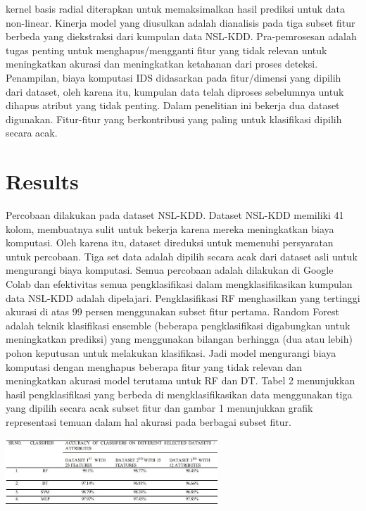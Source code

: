 \documentclass[conference]{IEEEtran}
\begin{document}
kernel basis radial diterapkan untuk memaksimalkan hasil prediksi untuk data non-linear. Kinerja model yang diusulkan adalah dianalisis pada tiga subset fitur berbeda yang diekstraksi dari kumpulan data NSL-KDD. Pra-pemrosesan adalah tugas penting untuk menghapus/mengganti fitur yang tidak relevan untuk meningkatkan akurasi dan meningkatkan ketahanan dari proses deteksi. Penampilan, biaya komputasi IDS didasarkan pada fitur/dimensi yang dipilih dari dataset, oleh karena itu, kumpulan data telah diproses sebelumnya untuk dihapus atribut yang tidak penting. Dalam penelitian ini bekerja dua dataset digunakan. Fitur-fitur yang berkontribusi yang paling untuk klasifikasi dipilih secara acak.

\section{Results}
Percobaan dilakukan pada dataset NSL-KDD. Dataset NSL-KDD memiliki 41 kolom, membuatnya sulit untuk bekerja karena mereka meningkatkan biaya komputasi. Oleh karena itu, dataset direduksi untuk memenuhi persyaratan untuk percobaan. Tiga set data adalah dipilih secara acak dari dataset asli untuk mengurangi biaya komputasi. Semua percobaan adalah dilakukan di Google Colab dan efektivitas semua pengklasifikasi dalam mengklasifikasikan kumpulan data NSL-KDD adalah dipelajari. Pengklasifikasi RF menghasilkan yang tertinggi akurasi di atas 99 persen menggunakan subset fitur pertama. Random Forest adalah teknik klasifikasi ensemble (beberapa pengklasifikasi digabungkan untuk meningkatkan prediksi) yang menggunakan bilangan berhingga (dua atau lebih) pohon keputusan untuk melakukan klasifikasi. Jadi model mengurangi biaya komputasi dengan menghapus beberapa fitur yang tidak relevan dan meningkatkan akurasi model terutama untuk RF dan DT. Tabel 2 menunjukkan hasil pengklasifikasi yang berbeda di mengklasifikasikan data menggunakan tiga yang dipilih secara acak subset fitur dan gambar 1 menunjukkan grafik representasi temuan dalam hal akurasi pada berbagai subset fitur.

\begin{minipage}{\linewidth}
\centerline{\includegraphics[width=80mm]{Gambar/gambar2.JPG}}
\label{fig2}
\end{minipage}
\end{document}
